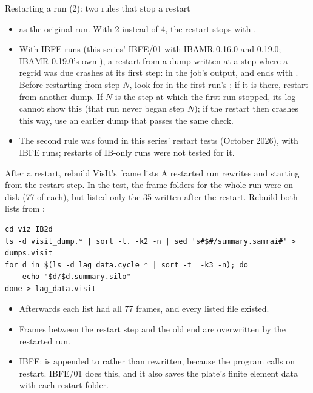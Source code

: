 \documentclass[aspectratio=169,11pt]{beamer}
\begin{document}
\begin{frame}{Restarting a run (2): two rules that stop a restart}
\label{fr:restart2}
\small
\begin{itemize}\setlength{\itemsep}{6pt}
  \item {} as the original run. With 2 instead of 4, the restart stops with .
  \item {} With IBFE runs (this series' IBFE/01 with IBAMR 0.16.0 and 0.19.0; IBAMR 0.19.0's own ), a restart from a dump written at a step where a regrid was due crashes at its first step:  in the job's output, and  ends with . Before restarting from step $N$, look for  in the first run's ; if it is there, restart from another dump. If $N$ is the step at which the first run stopped, its log cannot show this (that run never began step $N$); if the restart then crashes this way, use an earlier dump that passes the same check.
  \item The second rule was found in this series' restart tests (October 2026), with IBFE runs; restarts of IB-only runs were not tested for it.
\end{itemize}
\end{frame}

\begin{frame}[fragile]{After a restart, rebuild VisIt's frame lists}
A restarted run rewrites  and  starting from the restart step. In the test, the frame folders for the whole run were on disk (77 of each), but  listed only the 35 written after the restart. Rebuild both lists from :
\begin{lstlisting}[style=shell]
cd viz_IB2d
ls -d visit_dump.* | sort -t. -k2 -n | sed 's#$#/summary.samrai#' > dumps.visit
for d in $(ls -d lag_data.cycle_* | sort -t_ -k3 -n); do
    echo "$d/$d.summary.silo"
done > lag_data.visit
\end{lstlisting}
\begin{itemize}\small
  \item Afterwards each list had all 77 frames, and every listed file existed.
  \item Frames between the restart step and the old end are overwritten by the restarted run.
  \item IBFE:  is appended to rather than rewritten, because the program calls  on restart. IBFE/01 does this, and it also saves the plate's finite element data with each restart folder.
\end{itemize}
\end{frame}
\end{document}
